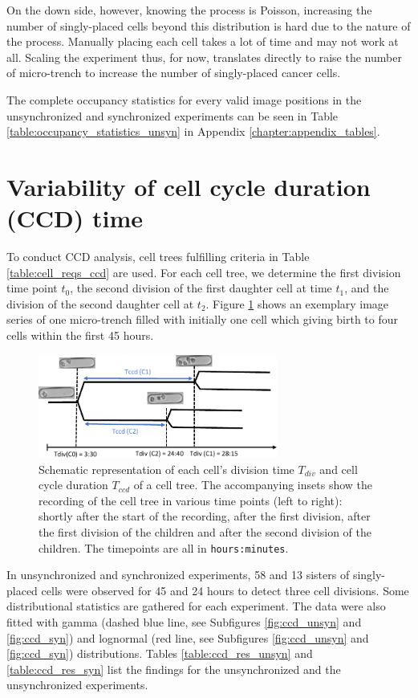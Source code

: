 \documentclass[pdftex,12pt,a4paper]{report}
\begin{document}
On the down side, however, knowing the process is Poisson, increasing the number of singly-placed cells beyond this distribution is hard due to the nature of the process. Manually placing each cell takes a lot of time and may not work at all. Scaling the experiment thus, for now, translates directly to raise the number of micro-trench to increase the number of singly-placed cancer cells.

The complete occupancy statistics for every valid image positions in the unsynchronized and synchronized experiments can be seen in Table \ref{table:occupancy_statistics_unsyn} in Appendix \ref{chapter:appendix_tables}.

\section{Variability of cell cycle duration (CCD) time}
\label{section:cell_cycle_duration}

To conduct CCD analysis, cell trees fulfilling criteria in Table \ref{table:cell_reqs_ccd} are used. For each cell tree, we determine the first division time point $t_0$, the second division of the first daughter cell at time $t_1$, and the division of the second daughter cell at $t_2$. Figure \ref{fig:ccd_schema} shows an exemplary image series of one micro-trench filled with initially one cell which giving birth to four cells within the first 45 hours. 

\begin{figure}[H]
\centering
\includegraphics[width=0.7\textwidth]{images/divs/cell_graphics.pdf}
\caption{Schematic representation of each cell's division time $T_{div}$ and cell cycle duration $T_{ccd}$ of a cell tree. The accompanying insets show the recording of the cell tree in various time points (left to right): shortly after the start of the recording, after the first division, after the first division of the children and after the second division of the children. The timepoints are all in \texttt{hours:minutes}.}
\label{fig:ccd_schema}
\end{figure}

In unsynchronized and synchronized experiments, 58 and 13 sisters of singly-placed cells were observed for 45 and 24 hours to detect three cell divisions. Some distributional statistics are gathered for each experiment. The data were also fitted with gamma (dashed blue line, see Subfigures \ref{fig:ccd_unsyn} and \ref{fig:ccd_syn}) and lognormal (red line, see Subfigures \ref{fig:ccd_unsyn} and \ref{fig:ccd_syn}) distributions.  Tables \ref{table:ccd_res_unsyn} and \ref{table:ccd_res_syn} list the findings for the unsynchronized and the unsynchronized experiments.
\end{document}
